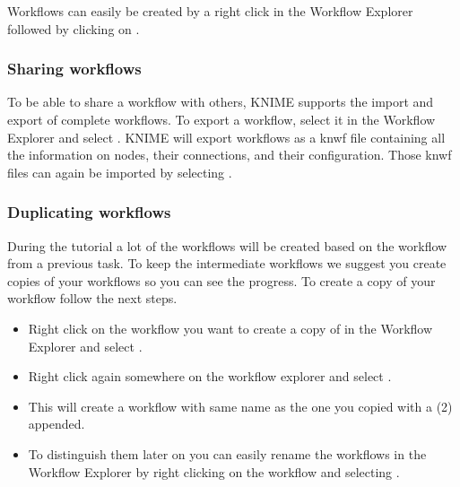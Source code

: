 Workflows can easily be created by a right click in the Workflow Explorer followed by clicking on .

\subsubsection{Sharing workflows}
\label{sec:sharing_workflows}

To be able to share a workflow with others, KNIME supports the import and export of complete workflows.
To export a workflow, select it in the Workflow Explorer and select .
KNIME will export workflows as a knwf file containing all the information on nodes, their connections, and their configuration.
Those knwf files can again be imported by selecting .


\subsubsection{Duplicating workflows}
\label{sec:duplicate-wf}

During the tutorial a lot of the workflows will be created based on the workflow from a previous task.
To keep the intermediate workflows we suggest you create copies of your workflows so you can see the progress.
To create a copy of your workflow follow the next steps.

\begin{itemize}
\item
Right click on the workflow you want to create a copy of in the Workflow Explorer and select .
\item
Right click again somewhere on the workflow explorer and select .
\item
This will create a workflow with same name as the one you copied with a (2) appended.
\item
To distinguish them later on you can easily rename the workflows in the Workflow Explorer by right clicking on the workflow and selecting . 
\end{itemize}

